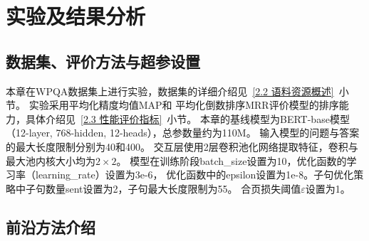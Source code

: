 \section{实验及结果分析}

\subsection{数据集、评价方法与超参设置}
本章在WPQA数据集上进行实验，数据集的详细介绍见~\ref{2.2 语料资源概述}~小节。
实验采用平均化精度均值MAP和
平均化倒数排序MRR评价模型的排序能力，具体介绍见~\ref{2.3 性能评价指标}~小节。
本章的基线模型为BERT-base模型（12-layer, 768-hidden, 12-heads），总参数量约为110M。
输入模型的问题与答案的最大长度限制分别为40和400。
交互层使用2层卷积池化网络提取特征，卷积与最大池内核大小均为$2\times2$。
模型在训练阶段batch\_size设置为10，优化函数的学习率（learning\_rate）设置为3e-6，
优化函数中的epsilon\cite{rutherford2002lecture}设置为1e-8。子句优化策略中子句数量sent设置为2，子句最大长度限制为55。
合页损失阈值$\varepsilon$设置为1。

\subsection{前沿方法介绍}


